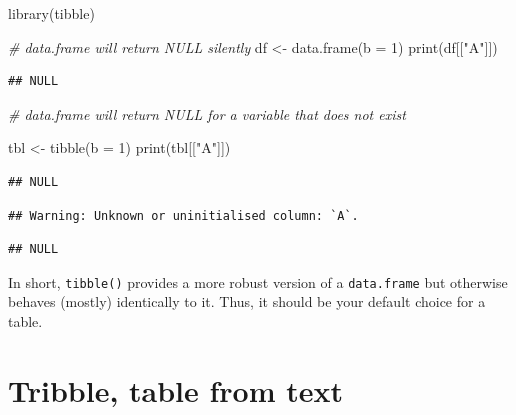 \documentclass[
]{book}
\newenvironment{Shaded}{\begin{snugshade}}{\end{snugshade}}
\newcommand{\AttributeTok}[1]{\textcolor[rgb]{0.77,0.63,0.00}{#1}}
\newcommand{\CommentTok}[1]{\textcolor[rgb]{0.56,0.35,0.01}{\textit{#1}}}
\newcommand{\DecValTok}[1]{\textcolor[rgb]{0.00,0.00,0.81}{#1}}
\newcommand{\FunctionTok}[1]{\textcolor[rgb]{0.00,0.00,0.00}{#1}}
\newcommand{\NormalTok}[1]{#1}
\newcommand{\OtherTok}[1]{\textcolor[rgb]{0.56,0.35,0.01}{#1}}
\newcommand{\SpecialCharTok}[1]{\textcolor[rgb]{0.00,0.00,0.00}{#1}}
\newcommand{\StringTok}[1]{\textcolor[rgb]{0.31,0.60,0.02}{#1}}
\begin{document}
\begin{Shaded}
\begin{Highlighting}[]
\FunctionTok{library}\NormalTok{(tibble)}

\CommentTok{\# data.frame will return NULL silently}
\NormalTok{df }\OtherTok{\textless{}{-}} \FunctionTok{data.frame}\NormalTok{(}\AttributeTok{b =} \DecValTok{1}\NormalTok{)}
\FunctionTok{print}\NormalTok{(df[[}\StringTok{"A"}\NormalTok{]])}
\end{Highlighting}
\end{Shaded}

\begin{verbatim}
## NULL
\end{verbatim}

\begin{Shaded}
\begin{Highlighting}[]
\CommentTok{\# data.frame will return NULL for a variable that does not exist}

\NormalTok{tbl }\OtherTok{\textless{}{-}} \FunctionTok{tibble}\NormalTok{(}\AttributeTok{b =} \DecValTok{1}\NormalTok{)}
\FunctionTok{print}\NormalTok{(tbl[[}\StringTok{"A"}\NormalTok{]])}
\end{Highlighting}
\end{Shaded}

\begin{verbatim}
## NULL
\end{verbatim}

\begin{Shaded}
\end{Shaded}

\begin{verbatim}
## Warning: Unknown or uninitialised column: `A`.
\end{verbatim}

\begin{verbatim}
## NULL
\end{verbatim}

In short, \texttt{tibble()} provides a more robust version of a \texttt{data.frame} but otherwise behaves (mostly) identically to it. Thus, it should be your default choice for a table.

\hypertarget{tribble}{%
\section{Tribble, table from text}\label{tribble}}
\end{document}
